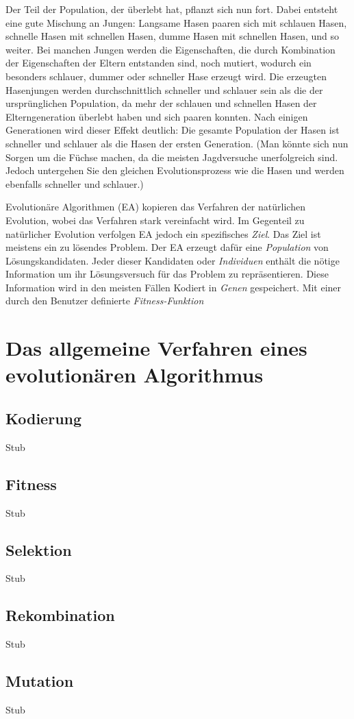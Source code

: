 Der Teil der Population, der überlebt hat, pflanzt sich nun fort. Dabei entsteht eine gute Mischung an Jungen: Langsame Hasen paaren sich mit schlauen Hasen, schnelle Hasen mit schnellen Hasen, dumme Hasen mit schnellen Hasen, und so weiter. Bei manchen Jungen werden die Eigenschaften, die durch Kombination der Eigenschaften der Eltern entstanden sind, noch mutiert, wodurch ein besonders schlauer, dummer oder schneller Hase erzeugt wird. Die erzeugten Hasenjungen werden durchschnittlich schneller und schlauer sein als die der ursprünglichen Population, da mehr der schlauen und schnellen Hasen der Elterngeneration überlebt haben und sich paaren konnten. Nach einigen Generationen wird dieser Effekt deutlich: Die gesamte Population der Hasen ist schneller und schlauer als die Hasen der ersten Generation. (Man könnte sich nun Sorgen um die Füchse machen, da die meisten Jagdversuche unerfolgreich sind. Jedoch untergehen Sie den gleichen Evolutionsprozess wie die Hasen und werden ebenfalls schneller und schlauer.)

Evolutionäre Algorithmen (EA) kopieren das Verfahren der natürlichen Evolution, wobei das Verfahren stark vereinfacht wird. Im Gegenteil zu natürlicher Evolution verfolgen EA jedoch ein spezifisches \textit{Ziel}. Das Ziel ist meistens ein zu lösendes Problem. Der EA erzeugt dafür eine \textit{Population} von Lösungskandidaten. Jeder dieser Kandidaten oder \textit{Individuen} enthält die nötige Information um ihr Lösungsversuch für das Problem zu repräsentieren. Diese Information wird in den meisten Fällen Kodiert in \textit{Genen} gespeichert. Mit einer durch den Benutzer definierte \textit{Fitness-Funktion}








\section{Das allgemeine Verfahren eines evolutionären Algorithmus}


\subsection{Kodierung}
Stub

\subsection{Fitness}
Stub

\subsection{Selektion}
Stub

\subsection{Rekombination}
Stub

\subsection{Mutation}
Stub
